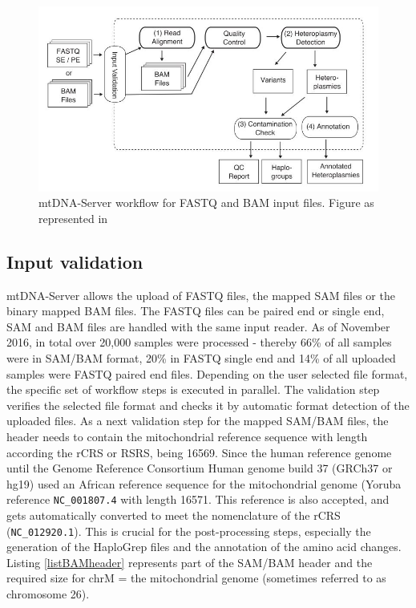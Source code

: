 \begin{figure}[h]
    \centering
    \includegraphics[width=1\textwidth]{images/mtdna-server.JPG}
    \caption[mtDNA-Server workflow for FASTQ and BAM input files]{mtDNA-Server workflow for FASTQ and BAM input files. Figure as represented in \cite{Weissensteiner2016b}}
    \label{fig:mtdna-server-architecture}
\end{figure}
\subsection{Input validation}
mtDNA-Server allows the upload of FASTQ files, the mapped SAM files or the binary mapped BAM files. The FASTQ files can be paired end or single end, SAM and BAM files are handled with the same input reader. As of November 2016, in total over 20,000 samples were processed - thereby 66\% of all samples were in SAM/BAM format, 20\% in FASTQ single end and 14\% of all uploaded samples were FASTQ paired end files. Depending on the user selected file format, the specific set of workflow steps is executed in parallel. The validation step verifies the selected file format and checks it by automatic format detection of the uploaded files. As a next validation step for the mapped SAM/BAM files, the header needs to contain the mitochondrial reference sequence with length according the rCRS or RSRS, being 16569. Since the human reference genome until the Genome Reference Consortium Human genome build 37 (GRCh37 or hg19) used an African reference sequence for the mitochondrial genome (Yoruba reference \texttt{NC\_001807.4} with length 16571. This reference is also accepted, and gets automatically converted to meet the nomenclature of the rCRS (\texttt{NC\_012920.1}). This is crucial for the post-processing steps, especially the generation of the HaploGrep files and the annotation of the amino acid changes. Listing \ref{listBAMheader} represents part of the SAM/BAM header and the required size for chrM = the mitochondrial genome (sometimes referred to as chromosome 26).

